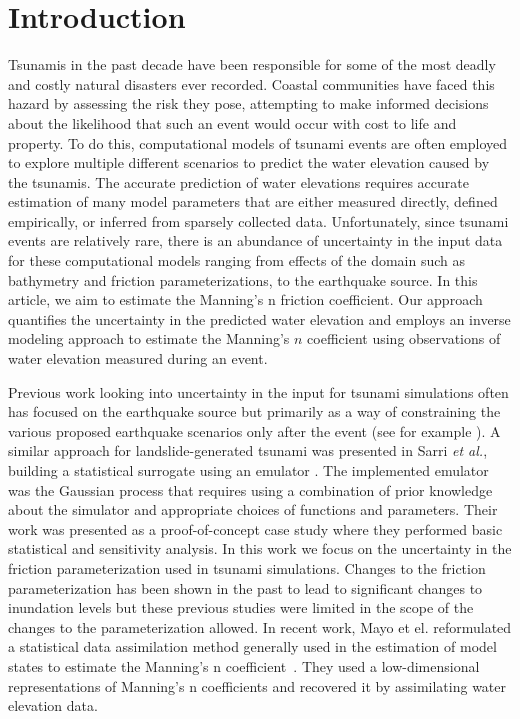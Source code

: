 
\section{Introduction}

Tsunamis in the past decade have been responsible for some of the most  deadly
and costly natural disasters ever recorded. Coastal communities  have faced this
hazard by assessing the risk they pose, attempting  to make informed decisions
about the likelihood that such an event would  occur with cost to life and
property.  To do this, computational models of  tsunami events are often
employed to explore multiple different scenarios to predict the water elevation
caused by the tsunamis. The accurate prediction  of water elevations requires
accurate estimation of many model parameters that  are either measured directly,
defined empirically, or inferred from sparsely collected data. Unfortunately,
since tsunami events are relatively rare,  there is an abundance of uncertainty
in the input data for these computational  models ranging from effects of the
domain such as bathymetry and friction parameterizations,  to the earthquake
source.  In this article, we aim to estimate the Manning's n friction
coefficient. Our approach quantifies the uncertainty in the predicted water
elevation  and employs an inverse modeling approach to estimate the Manning's
$n$ coefficient using observations of water elevation measured during an event.

Previous work looking into uncertainty in the input for tsunami simulations
often has focused on the earthquake source but primarily as a way of
constraining the various proposed earthquake scenarios only after the event (see
for example \cite{MacInnes:2013cr}).  A similar approach for landslide-generated
tsunami was presented in Sarri \emph{et al.}, building a statistical surrogate
using an emulator \cite{Sarri2012}.  The implemented emulator was the Gaussian
process that requires using a combination of prior knowledge about the simulator
and appropriate choices of functions and parameters. Their work was presented as
a proof-of-concept case study where they performed basic statistical and
sensitivity analysis. In this work we focus on the uncertainty in the friction
parameterization used in tsunami simulations.  Changes to the friction
parameterization has been shown in the past to lead to significant changes to
inundation levels \cite{Myers:2001el,Jakeman:2010hk} but these previous studies
were limited in the scope of the changes to the parameterization allowed.  In
recent work, Mayo et el. reformulated a statistical data assimilation method
generally used in the estimation of model states to estimate the Manning's n
coefficient~\cite{Mayo2013}. They used a low-dimensional representations of
Manning's n coefficients and recovered it by assimilating water elevation data.

